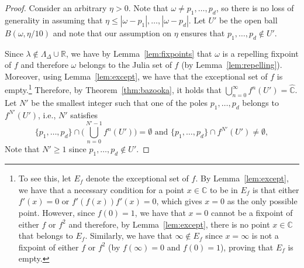 \documentclass[11pt]{article}
\def\Reals{\mathbb{R}}
\def\Complex{\mathbb{C}}
\def\Riem{\widehat{\Complex}}
\def\LambdaD{\Lambda_\Delta}
\newcommand{\fn}[2]{#1^{#2}}
\begin{document}
\begin{proof}
Consider an arbitrary $\eta>0$. Note that $\omega\neq p_1,\hdots,p_d$, so there is no loss of generality in assuming that $\eta\leq |\omega-p_1|, \hdots, |\omega-p_d|$.  Let $U'$ be the open ball $B(\omega,\eta/10)$ and note that our assumption on $\eta$ ensures that $p_1,\hdots,p_d\notin U'$.

Since $\lambda\notin \LambdaD\cup \Reals$, we have by Lemma~\ref{lem:fixpoints} that $\omega$ is a repelling fixpoint of $f$ and therefore $\omega$ belongs to the Julia set of $f$ (by Lemma~\ref{lem:repelling}). Moreover, using Lemma~\ref{lem:except}, we have that the exceptional set of $f$ is empty.\footnote{To see this, let $E_f$ denote the exceptional set of $f$. By Lemma~\ref{lem:except}, we have that a necessary condition for a point $x\in \Complex$ to be in $E_f$ is that either $f'(x)=0$ or $f'(f(x))f'(x)=0$, which gives $x=0$ as the only possible point.  However, since $f(0)=1$, we have that $x=0$ cannot be a fixpoint of either $f$ or $\fn{f}{2}$ and therefore, by Lemma~\ref{lem:except}, there is no point $x\in \Complex$ that belongs to $E_f$. Similarly, we have that $\infty\notin E_f$ since $x=\infty$ is not a fixpoint of either $f$ or $\fn{f}{2}$ (by $f(\infty)=0$ and $f(0)=1$), proving that $E_f$ is empty.} Therefore, by Theorem~\ref{thm:bazooka}, it holds that $\bigcup^{\infty}_{n=0}\fn{f}{n}(U')=\Riem$.   Let $N'$ be the smallest  integer such that one of the poles $p_1,\hdots,p_d$ belongs to $\fn{f}{N'}(U')$,  i.e., $N'$ satisfies
\begin{equation}\label{eq:Nchoice13}
\{p_1,\hdots,p_d\}\cap \Big(\bigcup^{N'-1}_{n=0}\fn{f}{n}(U')\Big)=\emptyset\mbox{ and } \{p_1,\hdots,p_d\}\cap \fn{f}{N'}(U')\neq \emptyset,
\end{equation}
Note that $N'\geq 1$ since $p_1,\hdots,p_d\not\in U'$. 


\end{proof}
\end{document}
